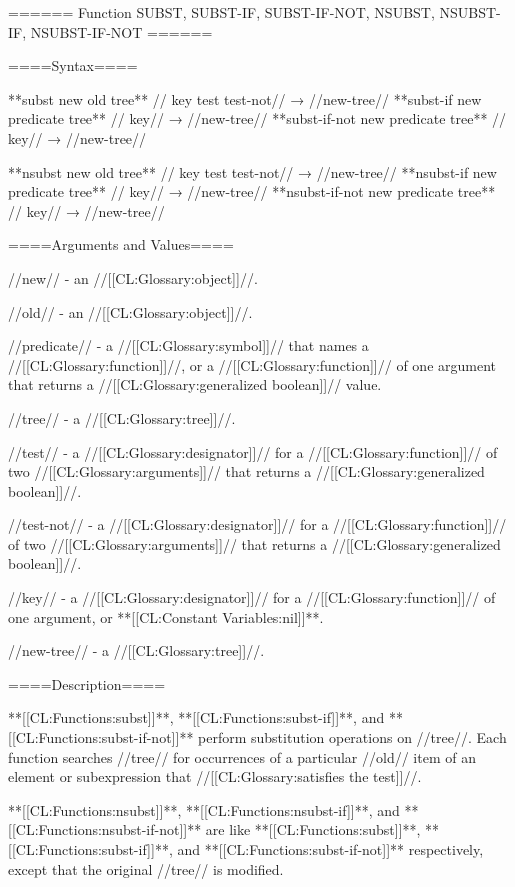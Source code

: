 ====== Function SUBST, SUBST-IF, SUBST-IF-NOT, NSUBST, NSUBST-IF, NSUBST-IF-NOT ======

====Syntax====

**subst {new old tree** //\key} key test test-not// → //new-tree// **subst-if {new predicate tree** //\key} key// → //new-tree// **subst-if-not {new predicate tree** //\key} key// → //new-tree//

**nsubst {new old tree** //\key} key test test-not// → //new-tree// **nsubst-if {new predicate tree** //\key} key// → //new-tree// **nsubst-if-not {new predicate tree** //\key} key// → //new-tree//

====Arguments and Values====

//new// - an //[[CL:Glossary:object]]//.

//old// - an //[[CL:Glossary:object]]//.

//predicate// - a //[[CL:Glossary:symbol]]// that names a //[[CL:Glossary:function]]//, or a //[[CL:Glossary:function]]// of one argument that returns a //[[CL:Glossary:generalized boolean]]// value.

//tree// - a //[[CL:Glossary:tree]]//.

//test// - a //[[CL:Glossary:designator]]// for a //[[CL:Glossary:function]]// of two //[[CL:Glossary:arguments]]// that returns a //[[CL:Glossary:generalized boolean]]//.

//test-not// - a //[[CL:Glossary:designator]]// for a //[[CL:Glossary:function]]// of two //[[CL:Glossary:arguments]]// that returns a //[[CL:Glossary:generalized boolean]]//.

//key// - a //[[CL:Glossary:designator]]// for a //[[CL:Glossary:function]]// of one argument, or **[[CL:Constant Variables:nil]]**.

//new-tree// - a //[[CL:Glossary:tree]]//.

====Description====

**[[CL:Functions:subst]]**, **[[CL:Functions:subst-if]]**, and **[[CL:Functions:subst-if-not]]** perform substitution operations on //tree//. Each function searches //tree// for occurrences of a particular //old// item of an element or subexpression that //[[CL:Glossary:satisfies the test]]//.

**[[CL:Functions:nsubst]]**, **[[CL:Functions:nsubst-if]]**, and **[[CL:Functions:nsubst-if-not]]** are like **[[CL:Functions:subst]]**, **[[CL:Functions:subst-if]]**, and **[[CL:Functions:subst-if-not]]** respectively, except that the original //tree// is modified.

